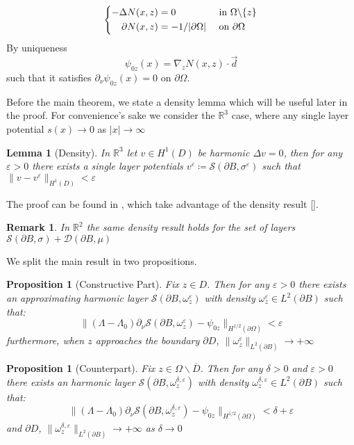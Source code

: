 \documentclass[10pt, a4paper, twoside, openright]{book}
\theoremstyle{definition}
\theoremstyle{plain}
\theoremstyle{plain}
\theoremstyle{plain}
\newtheorem{proposition}[subsection]{Proposition}
\theoremstyle{plain}
\newtheorem{remark}[subsection]{Remark}
\theoremstyle{plain}
\newtheorem{lemma}[subsection]{Lemma}
\theoremstyle{plain}
\theoremstyle{plain}
\theoremstyle{plain}
\let\epsilon\varepsilon
\begin{document}
 \begin{equation}
 \left\{
 \begin{aligned}
   -\Delta N(x,z) &= 0 &&\textup{ in }\Omega\backslash\{z\} \\
   \partial N(x,z) &= -1/|\partial \Omega|&&\textup{ on }\partial \Omega
 \end{aligned}
 \right.
 \end{equation}
 By uniqueness
 \begin{equation}
  \psi_{0z}(x) = \nabla_zN(x,z) \cdot \vec{d}
 \end{equation}
 such that it satisfies $\partial_\nu\psi_{0z}(x)=0$ on $\partial \Omega$.
 \par
 Before the main theorem, we state a density lemma which will be useful later in the proof. For convenience's sake we consider the $\mathbb{R}^3$ case, where any single layer potential $s(x)\to0$ as $|x|\to \infty$
\begin{lemma}[Density]
 \label{lemma:lsm-density}
 In $\mathbb{R}^3$ let $v\in H^1(D)$ be harmonic $\Delta v=0$, then for any $\epsilon>0$ there exists 
 a single layer potentials $v^\epsilon\coloneqq\mathcal{S}(\partial B, \sigma^\epsilon)$ such that $\|v-v^\epsilon\|_{H^1(D)}<\epsilon$
\end{lemma}
The proof can be found in \cite{somersalo:preprint}, which take advantage of the density result \ref{}.
\begin{remark}
 In $\mathbb{R}^2$ the same density result holds for the set of layers $\mathcal{S}(\partial B, \sigma)+ \mathcal{D}(\partial B,\mu)$ 
\end{remark}
We split the main result in two propositions.
\begin{proposition}[Constructive Part]
\label{prop:lsm-constructive}
Fix $z \in D$. Then for any $\epsilon > 0$ there exists an approximating harmonic layer $\mathcal{S}(\partial B, \omega^\epsilon_z)$ with density $\omega^\epsilon_z\in L^2(\partial B)$  such that:
\begin{equation}
 \|(\Lambda - \Lambda_0)\partial_\nu\mathcal{S}(\partial B, \omega^\epsilon_z) - \psi_{0z}\|_{H^{1/2}(\partial\Omega)} < \epsilon
\end{equation}
furthermore, when $z$ approaches the boundary $\partial D$, $\|\omega^\epsilon_z\|_{L^2(\partial B)}\to + \infty$
\end{proposition}
\begin{proposition}[Counterpart]
Fix $z \in \Omega\backslash\overline{D}$. Then for any $\delta>0$ and $\epsilon > 0$ there exists an harmonic layer $\mathcal{S}(\partial B, \omega^{\delta, \epsilon}_z)$ with density $\omega^{\delta, \epsilon}_z\in L^2(\partial B)$ such that:
\begin{equation}
 \|(\Lambda - \Lambda_0)\partial_\nu\mathcal{S}(\partial B, \omega^{\delta,\epsilon}_z) - \psi_{0z}\|_{H^{1/2}(\partial\Omega)} < \delta + \epsilon
\end{equation}
and $\partial D$, $\|\omega^{\delta, \epsilon}_z\|_{L^2(\partial B)}\to + \infty$ as $\delta\to 0$
\end{proposition}
\end{document}
